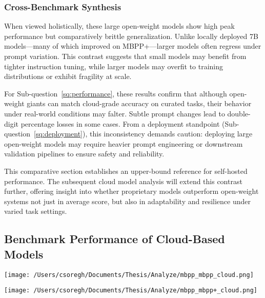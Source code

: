 \subsubsection*{Cross-Benchmark Synthesis}

When viewed holistically, these large open-weight models show high peak performance but comparatively brittle generalization. Unlike locally deployed 7B models—many of which improved on MBPP+—larger models often regress under prompt variation. This contrast suggests that small models may benefit from tighter instruction tuning, while larger models may overfit to training distributions or exhibit fragility at scale.

For Sub-question~\ref{sq:performance}, these results confirm that although open-weight giants can match cloud-grade accuracy on curated tasks, their behavior under real-world conditions may falter. Subtle prompt changes lead to double-digit percentage losses in some cases. From a deployment standpoint (Sub-question~\ref{sq:deployment}), this inconsistency demands caution: deploying large open-weight models may require heavier prompt engineering or downstream validation pipelines to ensure safety and reliability.

This comparative section establishes an upper-bound reference for self-hosted performance. The subsequent cloud model analysis will extend this contrast further, offering insight into whether proprietary models outperform open-weight systems not just in average score, but also in adaptability and resilience under varied task settings.


\subsection{Benchmark Performance of Cloud-Based Models}

\begin{center}
	\texttt{[image: /Users/csoregh/Documents/Thesis/Analyze/mbpp\_mbpp\_cloud.png]}
	\label{fig:mbpp-cloud}
\end{center}

\begin{center}
	\texttt{[image: /Users/csoregh/Documents/Thesis/Analyze/mbpp\_mbpp+\_cloud.png]}
	\label{fig:mbppplus-cloud}
\end{center}

